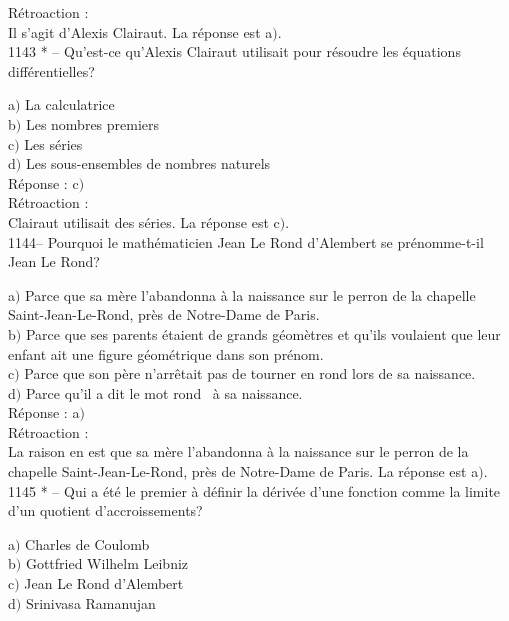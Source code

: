 ﻿\documentclass[letterpaper, 12pt]{article}
\begin{document}
R\'etroaction : \\
Il s'agit d'Alexis Clairaut. La r\'eponse est a$)$. \\

1143 * -- Qu'est-ce qu'Alexis Clairaut utilisait pour r\'esoudre les
\'equations diff\'erentielles?

a$)$ La calculatrice \\
b$)$ Les nombres premiers \\
c$)$ Les s\'eries \\
d$)$ Les sous-ensembles de nombres naturels  \\

R\'eponse : c$)$\\

R\'etroaction : \\
Clairaut utilisait des s\'eries. La r\'eponse est c$)$. \\

1144-- Pourquoi le math\'ematicien Jean Le Rond d'Alembert se
pr\'enomme-t-il Jean Le Rond?

a$)$ Parce que sa m\`ere l'abandonna \`a la naissance sur le perron de la
chapelle Saint-Jean-Le-Rond, pr\`es de
Notre-Dame de Paris. \\
b$)$ Parce que ses parents \'etaient de grands g\'eom\`etres et qu'ils
voulaient que leur enfant ait une figure
g\'eom\'etrique dans son pr\'enom. \\
c$)$ Parce que son p\`ere n'arr\^etait pas de tourner en rond lors de sa
naissance.  \\
d$)$ Parce qu'il a dit le mot \og rond \fg\ \`a sa naissance.  \\

R\'eponse : a$)$\\

R\'etroaction : \\
La raison en est que sa m\`ere l'abandonna \`a la naissance sur le
perron de la chapelle Saint-Jean-Le-Rond, pr\`es de
Notre-Dame de Paris. La r\'eponse est a$)$. \\

1145 * -- Qui a \'et\'e le premier \`a d\'efinir la d\'eriv\'ee
d'une fonction comme la limite d'un quotient d'accroissements?

a$)$ Charles de Coulomb \\
b$)$ Gottfried Wilhelm Leibniz \\
c$)$ Jean Le Rond d'Alembert \\
d$)$ Srinivasa Ramanujan  \\
\end{document}
